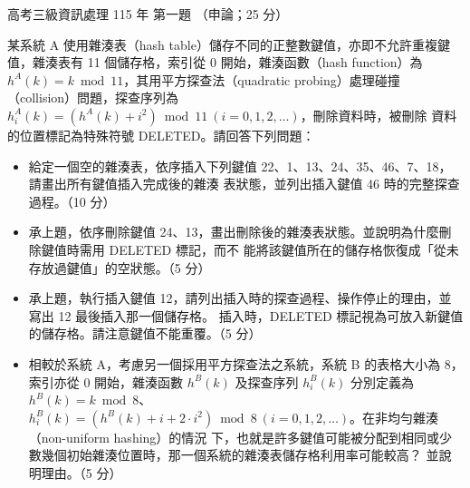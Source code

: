 \begin{pastexam}[label={px:gk3-115-ds-01}]{高考三級資訊處理 115 年 第一題}
（申論；25 分）

某系統 A 使用雜湊表（hash table）儲存不同的正整數鍵值，亦即不允許重複鍵值，雜湊表有 11 個儲存格，索引從 0
開始，雜湊函數（hash function）為$h^A(k) = k \bmod 11$，其用平方探查法（quadratic probing）處理碰撞
（collision）問題，探查序列為 $h_i^A(k) = (h^A(k) + i^2) \bmod 11\ (i = 0, 1, 2, \ldots)$，刪除資料時，被刪除
資料的位置標記為特殊符號 DELETED。請回答下列問題：
\begin{itemize}[leftmargin=2.2em]
\item[㈠] 給定一個空的雜湊表，依序插入下列鍵值 22、1、13、24、35、46、7、18，請畫出所有鍵值插入完成後的雜湊
表狀態，並列出插入鍵值 46 時的完整探查過程。（10 分）
\item[㈡] 承上題，依序刪除鍵值 24、13，畫出刪除後的雜湊表狀態。並說明為什麼刪除鍵值時需用 DELETED 標記，而不
能將該鍵值所在的儲存格恢復成「從未存放過鍵值」的空狀態。（5 分）
\item[㈢] 承上題，執行插入鍵值 12，請列出插入時的探查過程、操作停止的理由，並寫出 12 最後插入那一個儲存格。
插入時，DELETED 標記視為可放入新鍵值的儲存格。請注意鍵值不能重覆。（5 分）
\item[㈣] 相較於系統 A，考慮另一個採用平方探查法之系統，系統 B 的表格大小為 8，索引亦從 0 開始，雜湊函數
$h^B(k)$ 及探查序列 $h_i^B(k)$ 分別定義為 $h^B(k) = k \bmod 8$、
$h_i^B(k) = (h^B(k) + i + 2 \cdot i^2) \bmod 8\ (i = 0, 1, 2, \ldots)$。在非均勻雜湊（non-uniform hashing）的情況
下，也就是許多鍵值可能被分配到相同或少數幾個初始雜湊位置時，那一個系統的雜湊表儲存格利用率可能較高？
並說明理由。（5 分）
\end{itemize}
\end{pastexam}

